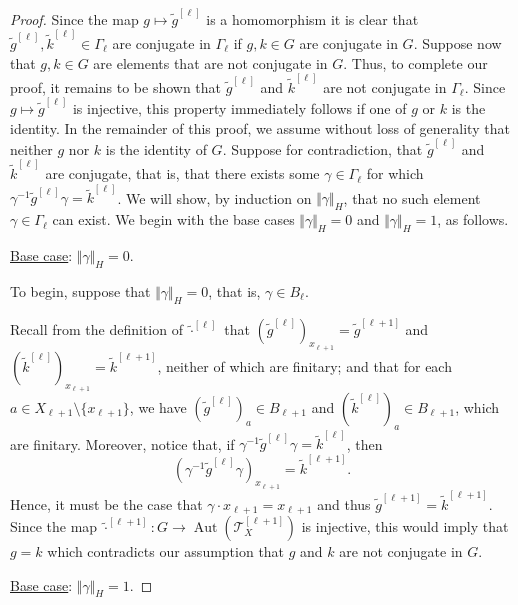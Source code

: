 \documentclass[10pt,a4paper]{amsart}
\DeclareMathOperator{\Aut}{Aut}
\newcommand{\T}{\mathcal{T}}
\newcommand{\absH}[1]{\Vert #1 \Vert_H}
\begin{document}
\begin{proof}
Since the map $g\mapsto \widetilde{g}^{[\ell]}$ is a homomorphism it is clear that $\widetilde{g}^{[\ell]},\widetilde{k}^{[\ell]}\in \Gamma_\ell$ are conjugate in $\Gamma_\ell$ if $g,k \in G$ are conjugate in $G$.
Suppose now that $g,k\in G$ are elements that are not conjugate in $G$.
Thus, to complete our proof, it remains to be shown that $\widetilde{g}^{[\ell]}$ and $\widetilde{k}^{[\ell]}$ are not conjugate in $\Gamma_\ell$.
Since $g\mapsto \widetilde{g}^{[\ell]}$ is injective, this property immediately follows if one of $g$ or $k$ is the identity.
In the remainder of this proof, we assume without loss of generality that neither $g$ nor $k$ is the identity of $G$.			 
Suppose for contradiction, that $\widetilde{g}^{[\ell]}$ and $\widetilde{k}^{[\ell]}$ are conjugate, that is, that there exists some $\gamma\in \Gamma_\ell$ for which $\gamma^{-1} \widetilde{g}^{[\ell]} \gamma = \widetilde{k}^{[\ell]}$.
We will show, by induction on $\absH{\gamma}$, that no such element $\gamma\in \Gamma_\ell$ can exist.
We begin with the base cases $\absH{\gamma} = 0$ and $\absH{\gamma}=1$, as follows.

\medskip

\noindent\underline{Base case}: $\absH{\gamma} = 0$.
\nopagebreak

\nopagebreak\smallskip
\nopagebreak\noindent
To begin, suppose that $\absH{\gamma}=0$, that is, $\gamma\in B_\ell$.

Recall from the definition of $\widetilde{\cdot}^{[\ell]}$ that
$(\widetilde{g}^{[\ell]})_{x_{\ell+1}} = \widetilde{g}^{[\ell+1]}$ and
$(\widetilde{k}^{[\ell]})_{x_{\ell+1}} = \widetilde{k}^{[\ell+1]}$, neither of which are finitary;
and that for each $a\in X_{\ell+1}\setminus\{x_{\ell+1}\}$, we have $(\widetilde{g}^{[\ell]})_{a} \in B_{\ell+1}$ and
$(\widetilde{k}^{[\ell]})_{a} \in B_{\ell+1}$, which are finitary.
Moreover, notice that, if $\gamma^{-1} \widetilde{g}^{[\ell]} \gamma = \widetilde{k}^{[\ell]}$, then
\[
(\gamma^{-1} \widetilde{g}^{[\ell]} \gamma)_{x_{\ell+1}}
= \widetilde{k}^{[\ell+1]}.
\]
Hence, it must be the case that $\gamma\cdot x_{\ell+1}=x_{\ell+1}$ and thus $\widetilde{g}^{[\ell+1]} = \widetilde{k}^{[\ell+1]}$.
Since the map $\widetilde{\cdot}^{[\ell+1]} \colon G \to \Aut(\T_X^{[\ell+1]})$ is injective, this would imply that $g=k$ which contradicts our assumption that $g$ and $k$ are not conjugate in $G$.

\medskip

\noindent\underline{Base case}: $\absH{\gamma} = 1$.
\nopagebreak


\end{proof}
\end{document}

